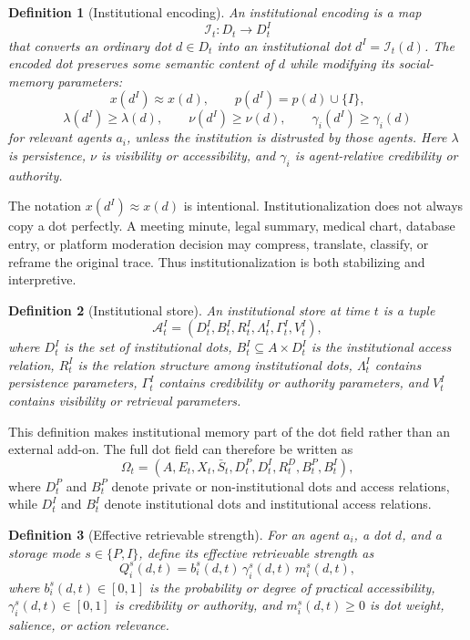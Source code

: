 \documentclass[11pt]{article}
\newtheorem{definition}{Definition}
\theoremstyle{remark}
\begin{document}
\begin{definition}[Institutional encoding]\label{def:institutional-encoding}
An institutional encoding is a map
$$
\mathcal I_t:D_t\rightarrow D^I_t
$$
that converts an ordinary dot $d\in D_t$ into an institutional dot
$d^I=\mathcal I_t(d)$. The encoded dot preserves some semantic content
of $d$ while modifying its social-memory parameters:
$$
x(d^I)\approx x(d), \qquad p(d^I)=p(d)\cup\{I\},
$$
$$
\lambda(d^I)\geq \lambda(d), \qquad
\nu(d^I)\geq \nu(d), \qquad
\gamma_i(d^I)\geq \gamma_i(d)
$$
for relevant agents $a_i$, unless the institution is distrusted by
those agents. Here $\lambda$ is persistence, $\nu$ is visibility or
accessibility, and $\gamma_i$ is agent-relative credibility or
authority.
\end{definition}

The notation $x(d^I)\approx x(d)$ is intentional. Institutionalization
does not always copy a dot perfectly. A meeting minute, legal summary,
medical chart, database entry, or platform moderation decision may
compress, translate, classify, or reframe the original trace. Thus
institutionalization is both stabilizing and interpretive.

\begin{definition}[Institutional store]\label{def:institutional-store}
An institutional store at time $t$ is a tuple
$$
\mathcal A_t^I=(D_t^I,B_t^I,R_t^I,\Lambda_t^I,\Gamma_t^I,V_t^I),
$$
where $D_t^I$ is the set of institutional dots, $B_t^I\subseteq A\times
D_t^I$ is the institutional access relation, $R_t^I$ is the relation
structure among institutional dots, $\Lambda_t^I$ contains persistence
parameters, $\Gamma_t^I$ contains credibility or authority parameters,
and $V_t^I$ contains visibility or retrieval parameters.
\end{definition}

This definition makes institutional memory part of the dot field rather
than an external add-on. The full dot field can therefore be written as
$$
\Omega_t=(A,E_t,X_t,\bar S_t,D_t^P,D_t^I,R_t^D,B_t^P,B_t^I),
$$
where $D_t^P$ and $B_t^P$ denote private or non-institutional dots and
access relations, while $D_t^I$ and $B_t^I$ denote institutional dots and
institutional access relations.

\begin{definition}[Effective retrievable strength]\label{def:effective-retrievable-strength}
For an agent $a_i$, a dot $d$, and a storage mode $s\in\{P,I\}$, define
its effective retrievable strength as
$$
Q_i^s(d,t)=b_i^s(d,t)\,\gamma_i^s(d,t)\,m_i^s(d,t),
$$
where $b_i^s(d,t)\in[0,1]$ is the probability or degree of practical
accessibility, $\gamma_i^s(d,t)\in[0,1]$ is credibility or authority,
and $m_i^s(d,t)\geq0$ is dot weight, salience, or action relevance.
\end{definition}
\end{document}
